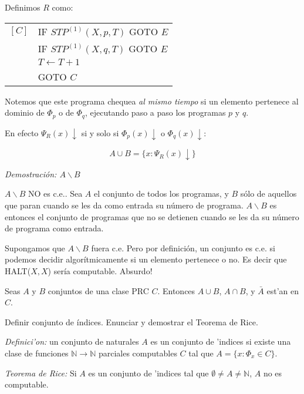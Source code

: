 \begin{questions}
\begin{solution}
  Definimos $R$ como: 

  \vspace{0.5cm}
  \begin{tabular}{rl}
  $[C]$ & IF $STP^{(1)}(X, p, T)$ GOTO $E$ \\
      & IF $STP^{(1)}(X, q, T)$ GOTO $E$ \\
      & $T \leftarrow T + 1$ \\
      & GOTO $C$
  \end{tabular}
  \vspace{0.5cm}

  Notemos que este programa chequea \emph{al mismo tiempo} si un elemento pertenece al dominio de $\Phi_p$ o de $\Phi_q$, ejecutando paso a paso los programas $p$ y $q$. 

  En efecto $\Psi_R(x)\downarrow$ si y solo si $\Phi_p(x)\downarrow$ o $\Phi_q(x)\downarrow$: 

  \begin{equation*}
  A\cup B = \{ x : \Psi_R(x)\downarrow \}
  \end{equation*}

  {\it Demostraci\'on: $A\backslash B$}

  $A\backslash B$ NO es c.e.. Sea $A$ el conjunto de todos los programas, y $B$ s\'olo de aquellos que paran cuando se les da como entrada su n\'umero de programa. $A\backslash B$ es entonces el conjunto de programas que no se detienen cuando se les da su n\'umero de programa como entrada. 
  
  Supongamos que $A\backslash B$ fuera c.e. Pero por definici\'on, un conjunto es c.e. si podemos decidir algor\'itmicamente si un elemento pertenece o no. Es decir que HALT($X,X$) ser\'ia computable. Absurdo!
  
\end{solution}

\question Seas $A$ y $B$ conjuntos de una clase PRC $C$. Entonces $A\cup B$, $A\cap B$, y $\bar{A}$ est'an en $C$.

\question Definir conjunto de índices. Enunciar y demostrar el Teorema de Rice.
\begin{solution}
  
  {\it Definici'on:} un conjunto de naturales $A$ es un conjunto de 'indices si existe una clase de funciones $\mathbb{N} \rightarrow \mathbb{N}$ parciales computables $C$ tal que $A = \{ x : \Phi_x \in C \}$. 

  {\it Teorema de Rice:} Si $A$ es un conjunto de 'indices tal que $\emptyset \neq A \neq \mathbb{N}$, $A$ no es computable. 


\end{solution}
\end{questions}
